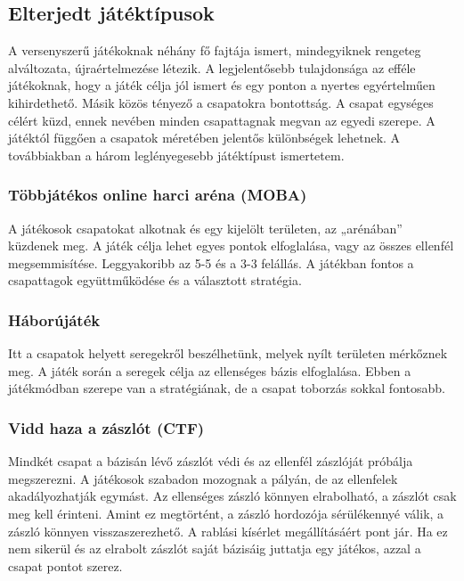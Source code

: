 \documentclass[]{article}
\begin{document}
\subsection{Elterjedt
játéktípusok}

A versenyszerű játékoknak néhány fő fajtája ismert, mindegyiknek
rengeteg alváltozata, újraértelmezése létezik. A legjelentősebb
tulajdonsága az efféle játékoknak, hogy a játék célja jól ismert és egy
ponton a nyertes egyértelműen kihirdethető. Másik közös tényező a
csapatokra bontottság. A csapat egységes célért küzd, ennek nevében
minden csapattagnak megvan az egyedi szerepe. A játéktól függően a
csapatok méretében jelentős különbségek lehetnek. A továbbiakban a három
leglényegesebb játéktípust ismertetem.


\subsubsection{Többjátékos online harci aréna
(MOBA)}

A játékosok csapatokat alkotnak és egy kijelölt területen, az
„arénában'' küzdenek meg. A játék célja lehet egyes pontok elfoglalása,
vagy az összes ellenfél megsemmisítése. Leggyakoribb az 5-5 és a 3-3
felállás. A játékban fontos a csapattagok együttműködése és a választott
stratégia.


\subsubsection{Háborújáték}

Itt a csapatok helyett seregekről beszélhetünk, melyek nyílt területen
mérkőznek meg. A játék során a seregek célja az ellenséges bázis
elfoglalása. Ebben a játékmódban szerepe van a stratégiának, de a csapat
toborzás sokkal fontosabb.


\subsubsection{Vidd haza a zászlót
(CTF)}

Mindkét csapat a bázisán lévő zászlót védi és az ellenfél zászlóját
próbálja megszerezni. A játékosok szabadon mozognak a pályán, de az
ellenfelek akadályozhatják egymást. Az ellenséges zászló könnyen
elrabolható, a zászlót csak meg kell érinteni. Amint ez megtörtént, a
zászló hordozója sérülékennyé válik, a zászló könnyen visszaszerezhető.
A rablási kísérlet megállításáért pont jár. Ha ez nem sikerül és az
elrabolt zászlót saját bázisáig juttatja egy játékos, azzal a csapat
pontot szerez.
\end{document}
